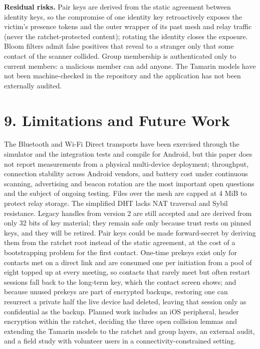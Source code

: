 \documentclass[conference]{IEEEtran}
\begin{document}
\textbf{Residual risks.} Pair keys are derived from the static agreement between identity keys, so the compromise of one identity key retroactively exposes the victim's presence tokens and the outer wrapper of its past mesh and relay traffic (never the ratchet-protected content); rotating the identity closes the exposure. Bloom filters admit false positives that reveal to a stranger only that some contact of the scanner collided. Group membership is authenticated only to current members: a malicious member can add anyone. The Tamarin models have not been machine-checked in the repository and the application has not been externally audited.

\section{9. Limitations and Future Work}
The Bluetooth and Wi-Fi Direct transports have been exercised through the simulator and the integration tests and compile for Android, but this paper does not report measurements from a physical multi-device deployment; throughput, connection stability across Android vendors, and battery cost under continuous scanning, advertising and beacon rotation are the most important open questions and the subject of ongoing testing. Files over the mesh are capped at 4 MiB to protect relay storage. The simplified DHT lacks NAT traversal and Sybil resistance. Legacy handles from version 2 are still accepted and are derived from only 32 bits of key material; they remain safe only because trust rests on pinned keys, and they will be retired. Pair keys could be made forward-secret by deriving them from the ratchet root instead of the static agreement, at the cost of a bootstrapping problem for the first contact. One-time prekeys exist only for contacts met on a direct link and are consumed one per initiation from a pool of eight topped up at every meeting, so contacts that rarely meet but often restart sessions fall back to the long-term key, which the contact screen shows; and because unused prekeys are part of encrypted backups, restoring one can resurrect a private half the live device had deleted, leaving that session only as confidential as the backup. Planned work includes an iOS peripheral, header encryption within the ratchet, deciding the three open collision lemmas and extending the Tamarin models to the ratchet and group layers, an external audit, and a field study with volunteer users in a connectivity-constrained setting.
\end{document}
